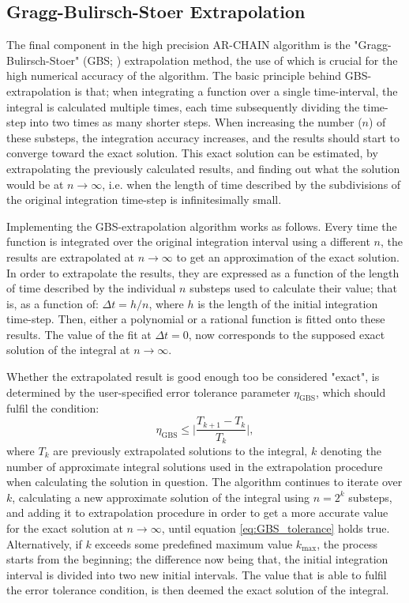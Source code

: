 \documentclass[english, twoside]{HYgradu}
\begin{document}
\subsection{Gragg-Bulirsch-Stoer Extrapolation} \label{section:extrapolation}

The final component in the high precision AR-CHAIN algorithm is the "Gragg-Bulirsch-Stoer" (GBS; \citealt{Gragg1965, Bulirsch1966}) extrapolation method, the use of which is crucial for the high numerical accuracy of the algorithm. The basic principle behind GBS-extrapolation is that; when integrating a function over a single time-interval, the integral is calculated multiple times, each time subsequently dividing the time-step into two times as many shorter steps. When increasing the number ($n$) of these substeps, the integration accuracy increases, and the results should start to converge toward the exact solution. This exact solution can be estimated, by extrapolating the previously calculated results, and finding out what the solution would be at $n \rightarrow \infty$, i.e. when the length of time described by the subdivisions of the original integration time-step is infinitesimally small.

Implementing the GBS-extrapolation algorithm works as follows. Every time the function is integrated over the original integration interval using a different $n$, the results are extrapolated at $n \rightarrow \infty$ to get an approximation of the exact solution. In order to extrapolate the results, they are expressed as a function of the length of time described by the individual $n$ substeps used to calculate their value; that is, as a function of: $\Delta t = h/n$, where $h$ is the length of the initial integration time-step. Then, either a polynomial or a rational function is fitted onto these results. The value of the fit at $\Delta t = 0$, now corresponds to the supposed exact solution of the integral at $n \rightarrow \infty$.

Whether the extrapolated result is good enough too be considered "exact", is determined by the user-specified error tolerance parameter $\eta_\mathrm{GBS}$, which should fulfil the condition:
\begin{equation}
\eta_\mathrm{GBS} \leq \bigg| \frac{T_{k+1} - T_k}{T_k} \bigg|, \label{eq:GBS_tolerance}
\end{equation}
where $T_k$ are previously extrapolated solutions to the integral, $k$ denoting the number of approximate integral solutions used in the extrapolation procedure when calculating the solution in question. The algorithm continues to iterate over $k$, calculating a new approximate solution of the integral using $n = 2^k$ substeps, and adding it to extrapolation procedure in order to get a more accurate value for the exact solution at $n \rightarrow \infty$, until equation \ref{eq:GBS_tolerance} holds true. Alternatively, if $k$ exceeds some predefined maximum value $k_\mathrm{max}$, the process starts from the beginning; the difference now being that, the initial integration interval is divided into two new initial intervals. The value that is able to fulfil the error tolerance condition, is then deemed the exact solution of the integral.
\end{document}
